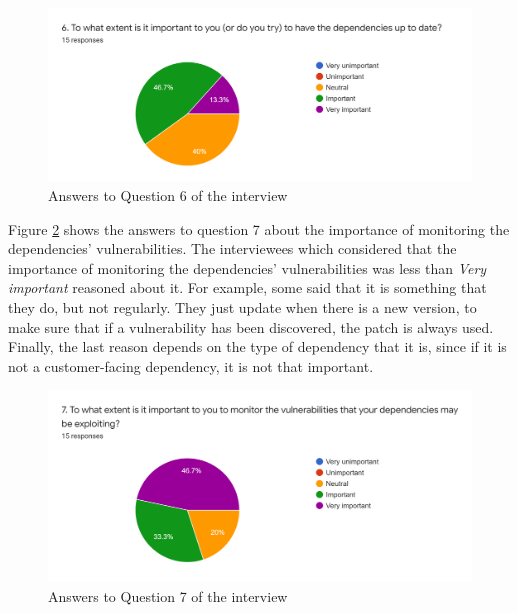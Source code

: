 \begin{figure}[ht!]
\begin{center}
\includegraphics[width=\textwidth]{figures/interview/Question6.png}
\caption{Answers to Question 6 of the interview}
\label{fig:interview-6}
\end{center}
\end{figure}

 Figure \ref{fig:interview-7} shows the answers to question 7 about the importance of monitoring the dependencies' vulnerabilities. The interviewees which considered that the importance of monitoring the dependencies' vulnerabilities was less than \textit{Very important} reasoned about it. For example, some said that it is something that they do, but not regularly. They just update when there is a new version, to make sure that if a vulnerability has been discovered, the patch is always used. Finally, the last reason depends on the type of dependency that it is, since if it is not a customer-facing dependency, it is not that important.

\begin{figure}[ht!]
\begin{center}
\includegraphics[width=\textwidth]{figures/interview/Question7.png}
\caption{Answers to Question 7 of the interview}
\label{fig:interview-7}
\end{center}
\end{figure}

